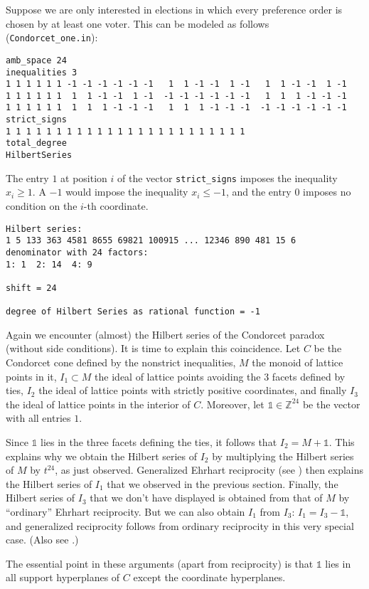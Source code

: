 \documentclass[12pt,a4paper]{scrartcl}
\theoremstyle{definition}
\def\ZZ{{\mathbb Z}}
\begin{document}
Suppose we are only interested in elections in which every preference order is chosen by at least one voter. This can be modeled as follows (\verb|Condorcet_one.in|):
\begin{Verbatim}
amb_space 24
inequalities 3
1 1 1 1 1 1 -1 -1 -1 -1 -1 -1   1  1 -1 -1  1 -1   1  1 -1 -1  1 -1
1 1 1 1 1 1  1  1 -1 -1  1 -1  -1 -1 -1 -1 -1 -1   1  1  1 -1 -1 -1
1 1 1 1 1 1  1  1  1 -1 -1 -1   1  1  1 -1 -1 -1  -1 -1 -1 -1 -1 -1
strict_signs
1 1 1 1 1 1 1 1 1 1 1 1 1 1 1 1 1 1 1 1 1 1 1 1
total_degree
HilbertSeries
\end{Verbatim}
The entry $1$ at position $i$ of the vector \verb|strict_signs| imposes the inequality $x_i\ge1$. A $-1$ would impose the inequality $x_i\le -1$, and the entry $0$ imposes no condition on the $i$-th coordinate.

\begin{Verbatim}
Hilbert series:
1 5 133 363 4581 8655 69821 100915 ... 12346 890 481 15 6 
denominator with 24 factors:
1: 1  2: 14  4: 9  

shift = 24

degree of Hilbert Series as rational function = -1
\end{Verbatim}
Again we encounter (almost) the Hilbert series of the Condorcet paradox (without side conditions). It is time to explain this coincidence. Let $C$ be the Condorcet cone defined by the nonstrict inequalities, $M$ the monoid of lattice points in it, $I_1\subset M$ the ideal of lattice points avoiding the $3$ facets defined by ties, $I_2$ the ideal of lattice points with strictly positive coordinates, and finally $I_3$ the ideal of lattice points in the interior of $C$. Moreover, let $\mathds{1}\in\ZZ^{24}$ be the vector with all entries $1$. 

Since $\mathds{1}$ lies in the three facets defining the ties, it follows that $I_2=M+\mathds{1}$. This explains why we obtain the Hilbert series of $I_2$ by multiplying the Hilbert series of $M$ by $t^{24}$, as just observed. Generalized Ehrhart reciprocity (see \cite[Theorem 6.70]{BG}) then explains the Hilbert series of $I_1$ that we observed in the previous section. Finally, the Hilbert series of $I_3$ that we don't have displayed is obtained from that of $M$ by  ``ordinary'' Ehrhart reciprocity. But we can also obtain $I_1$ from $I_3$: $I_1=I_3-\mathds{1}$, and generalized reciprocity follows from ordinary reciprocity in this very special case. (Also see \cite{BIS2}.)

The essential point in these arguments (apart from reciprocity) is that $\mathds{1}$ lies in all support hyperplanes of $C$ except the coordinate hyperplanes.
\end{document}
